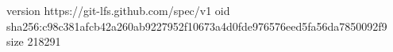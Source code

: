 version https://git-lfs.github.com/spec/v1
oid sha256:c98c381afcb42a260ab9227952f10673a4d0fde976576eed5fa56da7850092f9
size 218291
